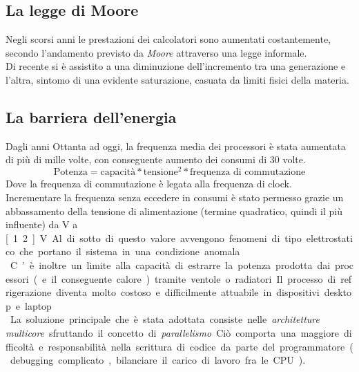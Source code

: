 \subsection{La legge di Moore}
Negli scorsi anni le prestazioni dei calcolatori sono aumentati costantemente, secondo l'andamento previsto da \textit{Moore} attraverso una legge informale.\\
Di recente si è assistito a una diminuzione dell’incremento tra una generazione e l’altra, sintomo di una evidente saturazione, casuata da limiti fisici della materia.

\subsection{La barriera dell'energia}
Dagli anni Ottanta ad oggi, la frequenza media dei processori è stata aumentata di più di mille volte, con conseguente aumento dei consumi di 30 volte.
\begin{equation*}
\text{Potenza} = \text{capacità}*\text{tensione}^2*\text{frequenza di commutazione}
\end{equation*}
Dove la frequenza di commutazione è legata alla frequenza di clock.\\
Incrementare la frequenza senza eccedere in consumi è stato permesso grazie un abbassamento della tensione di alimentazione (termine quadratico, quindi il più influente) da \unit[5]{V} a \unit[1.2]{V}. Al di sotto di questo valore avvengono fenomeni di tipo elettrostatico che portano il sistema in una condizione anomala.\\
C’è inoltre un limite alla capacità di estrarre la potenza prodotta dai processori (e il conseguente calore) tramite ventole o radiatori. Il processo di refrigerazione diventa molto
costoso e difficilmente attuabile in dispositivi desktop e laptop.\\

La soluzione principale che è stata adottata consiste nelle \textit{architetture multicore} sfruttando il concetto di \textit{parallelismo}. Ciò comporta una maggiore difficoltà e responsabilità nella scrittura di codice da parte del programmatore (debugging complicato, bilanciare il carico di lavoro fra le CPU).




